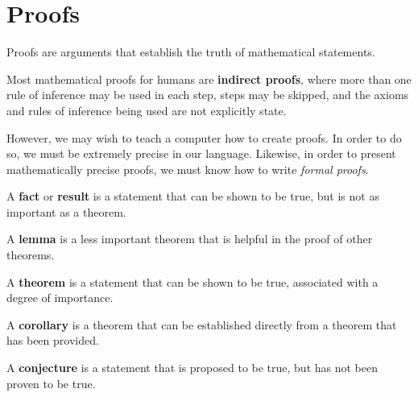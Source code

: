 \chapter{Proofs}
Proofs are arguments that establish the truth of mathematical statements.

Most mathematical proofs for humans are \textbf{indirect proofs},
where more than one rule of inference may be used in each step, steps may be skipped,
and the axioms and rules of inference being used are not explicitly state.

However, we may wish to teach a computer how to create proofs. In order to do
so, we must be extremely precise in our language. Likewise, in order to present
mathematically precise proofs, we must know how to write \emph{formal
proofs}.\cite[p.~81]{rosen}

\begin{defn}
  A \textbf{fact} or \textbf{result} is a statement that can be shown to be
  true, but is not as important as a theorem.
\end{defn}
\begin{defn}
  A \textbf{lemma} is a less important theorem that is helpful in the proof of
  other theorems.
\end{defn}
\begin{defn}
  A \textbf{theorem} is a statement that can be shown to be true, associated
  with a degree of importance.
\end{defn}
\begin{defn}
  A \textbf{corollary} is a theorem that can be established directly from a
  theorem that has been provided.
\end{defn}
\begin{defn}
  A \textbf{conjecture} is a statement that is proposed to be true, but has not
  been proven to be true.
\end{defn}

